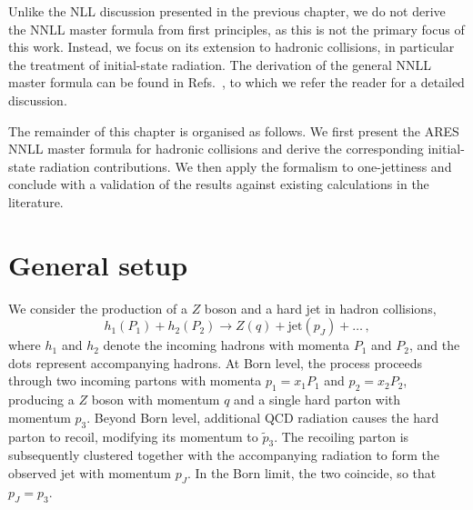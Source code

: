 Unlike the NLL discussion presented in the previous chapter, we do not
derive the NNLL master formula from first principles, as this is not the
primary focus of this work. Instead, we focus on its extension to
hadronic collisions, in particular the treatment of initial-state
radiation. The derivation of the general NNLL master formula can be
found in Refs.~\cite{Banfi:2014sua,Banfi:2018mcq,Arpino:2019ozn}, to
which we refer the reader for a detailed discussion.

The remainder of this chapter is organised as follows. We first present
the \textsc{ARES} NNLL master formula for hadronic collisions and derive
the corresponding initial-state radiation contributions. We then apply
the formalism to one-jettiness and conclude with a validation of the
results against existing calculations in the literature.

\section{General setup}
\label{sec:setup}

We consider the production of a $Z$ boson and a hard jet in hadron collisions,
\begin{equation}
  \label{eq:Z+jet}
  h_1(P_1)+h_2(P_2) \to Z(q) + \mathrm{jet}(p_J)+\dots\,,
\end{equation}
where $h_1$ and $h_2$ denote the incoming hadrons with momenta $P_1$ and $P_2$, and the dots represent accompanying hadrons. At Born level, the process proceeds through two incoming partons with momenta $p_1=x_1P_1$ and $p_2=x_2P_2$, producing a $Z$ boson with momentum $q$ and a single hard parton with momentum $p_3$. 
Beyond Born level, additional QCD radiation causes the hard parton to recoil, modifying its momentum to $\tilde p_3$. The recoiling parton is subsequently clustered together with the accompanying radiation to form the observed jet with momentum $p_J$. In the Born limit, the two coincide, so that $p_J=p_3$.

